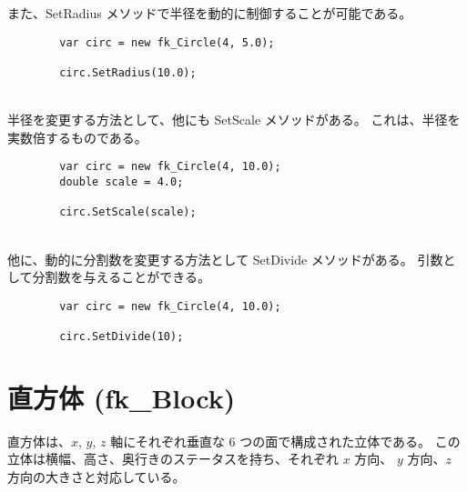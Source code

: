 また、SetRadius メソッドで半径を動的に制御することが可能である。
\\
\begin{screen}
\begin{verbatim}
        var circ = new fk_Circle(4, 5.0);

        circ.SetRadius(10.0);
\end{verbatim}
\end{screen}
~ \\半径を変更する方法として、他にも SetScale メソッドがある。
これは、半径を実数倍するものである。
\\
\begin{breakbox}
\begin{verbatim}
        var circ = new fk_Circle(4, 10.0);
        double scale = 4.0;

        circ.SetScale(scale);
\end{verbatim}
\end{breakbox}
~ \\
他に、動的に分割数を変更する方法として SetDivide メソッドがある。
引数として分割数を与えることができる。
\\
\begin{breakbox}
\begin{verbatim}
        var circ = new fk_Circle(4, 10.0);

        circ.SetDivide(10);
\end{verbatim}
\end{breakbox}

\section{直方体 (fk\_Block)}
直方体は、\(x\), \(y\), \(z\) 軸にそれぞれ垂直な
6 つの面で構成された立体である。
この立体は横幅、高さ、奥行きのステータスを持ち、それぞれ \(x\) 方向、
\(y\) 方向、\(z\) 方向の大きさと対応している。

